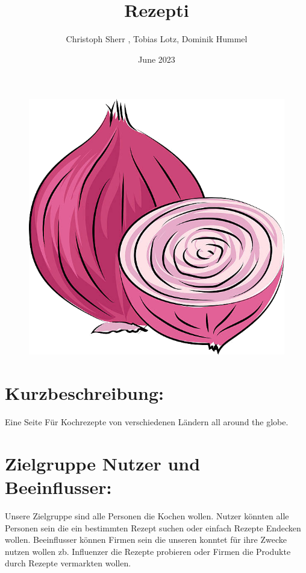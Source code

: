 \documentclass{article}
\title{Rezepti}
\author{ Christoph Sherr , Tobias Lotz, Dominik Hummel }
\date{June 2023}
\begin{document}
\begin{figure}
    \centering
    \includegraphics[scale=0.3]{Pictures/rezepti.png}
    \label{fig:sfig1}
\end{figure}
\maketitle

\pagebreak
\section{Kurzbeschreibung:}
Eine Seite Für Kochrezepte von verschiedenen Ländern all around the globe.

\section{Zielgruppe Nutzer und Beeinflusser:}
Unsere Zielgruppe sind alle Personen die Kochen wollen. Nutzer könnten alle Personen sein die ein bestimmten Rezept suchen oder einfach Rezepte Endecken wollen. Beeinflusser können Firmen sein die unseren konntet für ihre Zwecke nutzen wollen zb. Influenzer die Rezepte probieren oder Firmen die Produkte durch Rezepte vermarkten wollen.
\end{document}
